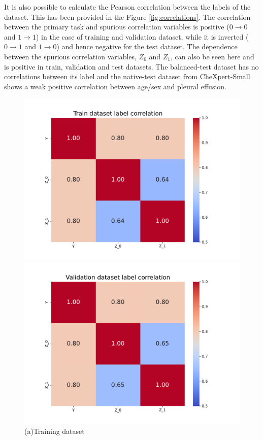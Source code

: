\documentclass[12pt,DIV14,BCOR12mm,a4paper,footinclude=false,headinclude,parskip=half-,twoside,openright,cleardoublepage=empty,toc=index,bibliography=totoc,listof=totoc]{scrreprt}
\numberwithin{equation}{chapter}
\begin{document}
It is also possible to calculate the Pearson correlation between the labels of the dataset. This has been provided in the Figure \ref{fig:correlations}. The correlation between the primary task and spurious correlation variables is positive ($0\rightarrow0$ and $1\rightarrow1$) in the case of training and validation dataset, while it is inverted ($0\rightarrow1$ and $1\rightarrow0$) and hence negative for the test dataset. The dependence between the spurious correlation variables, $Z_0$ and $Z_1$, can also be seen here and is positive in train, validation and test datasets. The balanced-test dataset has no correlations between its label and the native-test dataset from CheXpert-Small shows a weak positive correlation between age/sex and pleural effusion.

\begin{figure}[H]
    \centering
    \begin{minipage}[b]{0.3\textwidth}
        \centering
        \includegraphics[width=1.5\textwidth]{thesis/figures/train_corr.pdf}
        \caption*{(a)Training dataset}
        \label{fig:1}
    \end{minipage}
    \hfill
    \begin{minipage}[b]{0.3\textwidth}
        \centering
        \includegraphics[width=1.5\textwidth]{thesis/figures/val_corr.pdf}

\end{minipage}
\end{figure}
\end{document}
